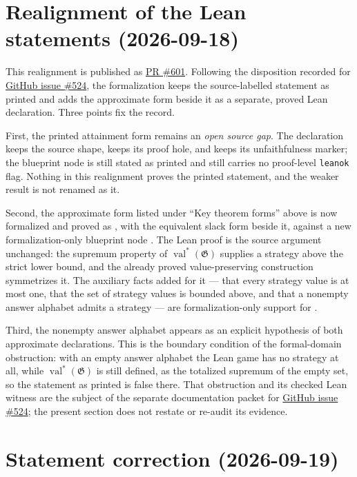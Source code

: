 \documentclass[11pt]{article}
\newcommand{\val}{\operatorname{val}}
\newcommand{\game}{\mathfrak{G}}
\renewcommand{\ghissue}[1]{%
  \href{https://github.com/Dengnifer/MIPStarRE-QPBT/issues/#1}{GitHub issue \##1}}
\renewcommand{\ghpr}[1]{%
  \href{https://github.com/Dengnifer/MIPStarRE-QPBT/pull/#1}{PR \##1}}
\begin{document}
\section{Realignment of the Lean statements (2026-09-18)}

This realignment is published as \ghpr{601}.  Following the disposition
recorded for \ghissue{524}, the formalization keeps
the source-labelled statement as printed and adds the approximate form beside
it as a separate, proved Lean declaration.  Three points fix the record.

First, the printed attainment form remains an \emph{open source gap}.  The
declaration  keeps the source
shape, keeps its proof hole, and keeps its unfaithfulness marker; the blueprint
node  is still stated as printed and still carries no
proof-level \texttt{leanok} flag.  Nothing in this realignment proves the
printed statement, and the weaker result is not renamed as it.

Second, the approximate form listed under ``Key theorem forms'' above is now
formalized and proved as
, with the equivalent
slack form 
beside it, against a new formalization-only blueprint node
.  The Lean proof is the source argument
unchanged: the supremum property of $\val^*(\game)$ supplies a strategy above
the strict lower bound, and the already proved value-preserving construction
 symmetrizes it.
The auxiliary facts added for it --- that every strategy value is at most one,
that the set of strategy values is bounded above, and that a nonempty answer
alphabet admits a strategy --- are formalization-only support for
.

Third, the nonempty answer alphabet appears as an explicit hypothesis of both
approximate declarations.  This is the boundary condition of the formal-domain
obstruction: with an empty answer alphabet the Lean game has no strategy at
all, while $\val^*(\game)$ is still defined, as the totalized supremum of the
empty set, so the statement as printed is false there.  That obstruction and
its checked Lean witness are the subject of the separate documentation packet
for \ghissue{524}; the present section does not restate or re-audit its
evidence.

\section{Statement correction (2026-09-19)}
\end{document}

